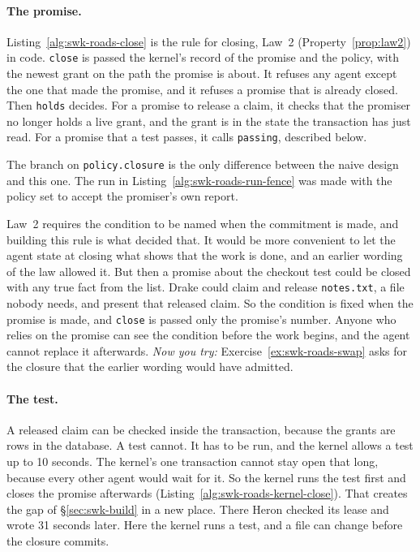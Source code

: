 \paragraph{The promise.}
Listing~\ref{alg:swk-roads-close} is the rule for closing, Law~2
(Property~\ref{prop:law2}) in code. \texttt{close} is passed the kernel's
record of the promise and the policy, with the newest grant on the path the
promise is about. It refuses any agent except the one that made the promise,
and it refuses a promise that is already closed. Then \texttt{holds}
decides. For a promise to release a claim, it checks that the promiser no
longer holds a live grant, and the grant is in the state the transaction has
just read. For a promise that a test passes, it calls \texttt{passing},
described below.


The branch on \texttt{policy.closure} is the only difference between the
naive design and this one. The run in Listing~\ref{alg:swk-roads-run-fence}
was made with the policy set to accept the promiser's own report.

Law~2 requires the condition to be named when the commitment is made, and
building this rule is what decided that. It would be more convenient to let
the agent state at closing what shows that the work is done, and an earlier
wording of the law allowed it. But then a promise about the checkout test
could be closed with any true fact from the list. Drake could claim and
release \texttt{notes.txt}, a file nobody needs, and present that released
claim. So the condition is fixed when the promise is made, and
\texttt{close} is passed only the promise's number. Anyone who relies on the
promise can see the condition before the work begins, and the agent cannot
replace it afterwards. \emph{Now you try:}
Exercise~\ref{ex:swk-roads-swap} asks for the closure that the earlier wording
would have admitted.

\paragraph{The test.}
A released claim can be checked inside the transaction, because the grants
are rows in the database. A test cannot. It has to be run, and the kernel
allows a test up to 10 seconds. The kernel's one transaction cannot stay
open that long, because every other agent would wait for it. So the kernel
runs the test first and closes the promise afterwards
(Listing~\ref{alg:swk-roads-kernel-close}). That creates the gap of
\S\ref{sec:swk-build} in a new place. There Heron checked its lease and
wrote 31 seconds later. Here the kernel runs a test, and a file can change
before the closure commits.

